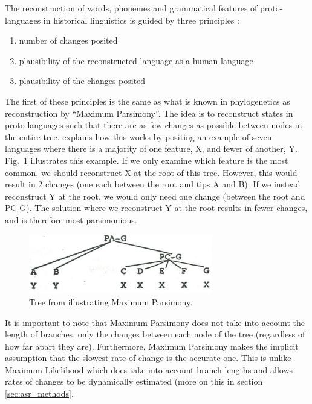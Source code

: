 \documentclass[a4paper,10pt]{article} %
\begin{document}
The reconstruction of words, phonemes and grammatical features of proto-languages in historical linguistics is guided by three principles \citep[17-22]{clark1976aspects}:

\begin{enumerate}[label=(\roman*)]
\item number of changes posited
\item plausibility of the reconstructed language as a human language
\item plausibility of the changes posited
\end{enumerate}

The first of these principles is the same as what is known in phylogenetics as reconstruction by ``Maximum Parsimony''. The idea is to reconstruct states in proto-languages such that there are as few changes as possible between nodes in the entire tree. \citet[17-22]{clark1976aspects} explains how this works by positing an example of seven languages where there is a majority of one feature, X, and fewer of another, Y. Fig.~\ref{fig:clark_tree} illustrates this example. If we only examine which feature is the most common, we should reconstruct X at the root of this tree. However, this would result in 2 changes (one each between the root and tips A and B). If we instead reconstruct Y at the root, we would only need one change (between the root and PC-G). The solution where we reconstruct Y at the root results in fewer changes, and is therefore most parsimonious.
 
\begin{figure}[h]
\centering
\includegraphics[width=8cm]{illustrations/Clark_1977_tree.png}
\caption{{Tree from \citet[19]{clark1976aspects} illustrating Maximum Parsimony.}}
\label{fig:clark_tree}
\end{figure}

It is important to note that Maximum Parsimony does not take into account the length of branches, only the changes between each node of the tree (regardless of how far apart they are). Furthermore, Maximum Parsimony makes the implicit assumption that the slowest rate of change is the accurate one. This is unlike Maximum Likelihood which does take into account branch lengths and allows rates of changes to be dynamically estimated (more on this in section \ref{sec:asr_methods}.
\end{document}
